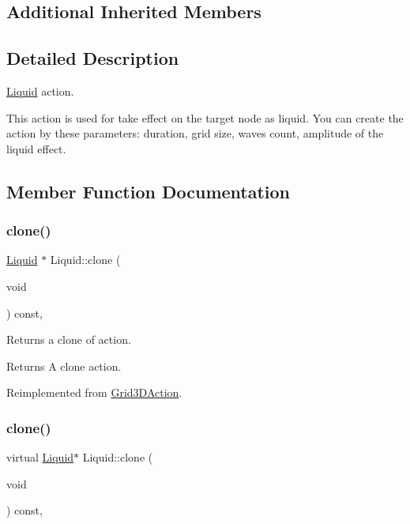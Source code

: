 \subsection*{Additional Inherited Members}


\subsection{Detailed Description}
\hyperlink{classLiquid}{Liquid} action. 

This action is used for take effect on the target node as liquid. You can create the action by these parameters\+: duration, grid size, waves count, amplitude of the liquid effect. 

\subsection{Member Function Documentation}
\mbox{\label{classLiquid_ae1ca20f6c336cad86c748c547d1b4420}} 
\subsubsection{\texorpdfstring{clone()}{clone()}\hspace{0.1cm}{\footnotesize\ttfamily [1/2]}}
{\footnotesize\ttfamily \hyperlink{classLiquid}{Liquid} $\ast$ Liquid\+::clone (\begin{DoxyParamCaption}\item[{void}]{ }\end{DoxyParamCaption}) const\hspace{0.3cm}{\ttfamily [override]}, {\ttfamily [virtual]}}

Returns a clone of action.

\begin{DoxyReturn}{Returns}
A clone action. 
\end{DoxyReturn}


Reimplemented from \hyperlink{classGrid3DAction_a01d5b2d60654ef66d6551ac2190ed14c}{Grid3\+D\+Action}.

\mbox{\label{classLiquid_a18fdff260e28b3bb195563cd8e60fdc3}} 
\subsubsection{\texorpdfstring{clone()}{clone()}\hspace{0.1cm}{\footnotesize\ttfamily [2/2]}}
{\footnotesize\ttfamily virtual \hyperlink{classLiquid}{Liquid}$\ast$ Liquid\+::clone (\begin{DoxyParamCaption}\item[{void}]{ }\end{DoxyParamCaption}) const\hspace{0.3cm}{\ttfamily [override]}, {\ttfamily [virtual]}}

